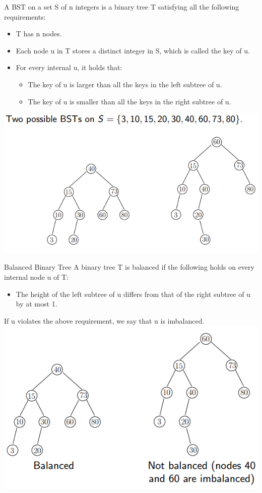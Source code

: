 \documentclass{lecture}
\begin{document}
\begin{landscape}
\begin{multicols}{2}
    \begin{note}{}
        A BST on a set S of n integers is a binary tree T satisfying all the following requirements:
        \begin{itemize}[nolistsep]
            \item T has n nodes.
            \item Each node u in T stores a distinct integer in S, which is called the key of u.
            \item For every internal u, it holds that:
                \begin{itemize}[nolistsep]
                    \item The key of u is larger than all the keys in the left subtree of u.
                    \item The key of u is smaller than all the keys in the right subtree of u.
                \end{itemize}
        \end{itemize}
        \includegraphics[width=\linewidth]{BST}
    \end{note}
    \vfill
    \begin{note}{Balanced Binary Tree}
        A binary tree T is balanced if the following holds on every internal node u of T:
        \begin{itemize}[nolistsep]
            \item The height of the left subtree of u differs from that of the right subtree of u by at most 1.
        \end{itemize}
        If u violates the above requirement, we say that u is imbalanced.
        \includegraphics[width=\linewidth]{balanced}

\end{note}
\end{multicols}
\end{landscape}
\end{document}
